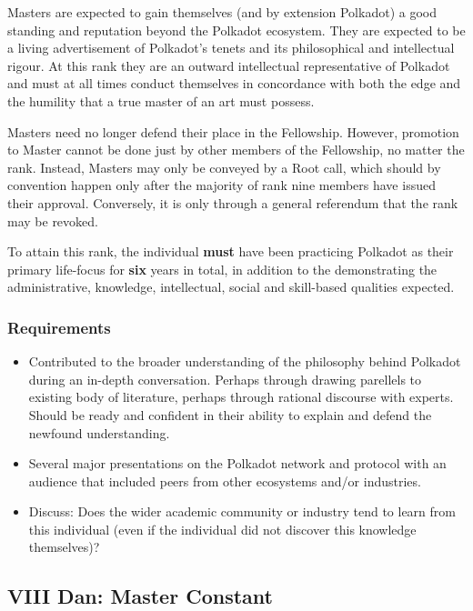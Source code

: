 \documentclass[9pt,oneside]{amsart}
\begin{document}
Masters are expected to gain themselves (and by extension Polkadot) a good standing and reputation beyond the Polkadot ecosystem. They are expected to be a living advertisement of Polkadot's tenets and its philosophical and intellectual rigour. At this rank they are an outward intellectual representative of Polkadot and must at all times conduct themselves in concordance with both the edge and the humility that a true master of an art must possess.

Masters need no longer defend their place in the Fellowship. However, promotion to Master cannot be done just by other members of the Fellowship, no matter the rank. Instead, Masters may only be conveyed by a Root call, which should by convention happen only after the majority of rank nine members have issued their approval. Conversely, it is only through a general referendum that the rank may be revoked.

To attain this rank, the individual \textbf{must} have been practicing Polkadot as their primary life-focus for \textbf{six} years in total, in addition to the demonstrating the administrative, knowledge, intellectual, social and skill-based qualities expected.

\subsubsection{Requirements}\label{requirements-7}

\begin{itemize}
\item Contributed to the broader understanding of the philosophy behind Polkadot during an in-depth conversation. Perhaps through drawing parellels to existing body of literature, perhaps through rational discourse with experts. Should be ready and confident in their ability to explain and defend the newfound understanding.
\item Several major presentations on the Polkadot network and protocol with an audience that included peers from other ecosystems and/or industries.
\item Discuss: Does the wider academic community or industry tend to learn from this individual (even if the individual did not discover this knowledge themselves)?
\end{itemize}

\subsection{VIII Dan: Master Constant}\label{viii-dan-master-constant}~\\
\end{document}
